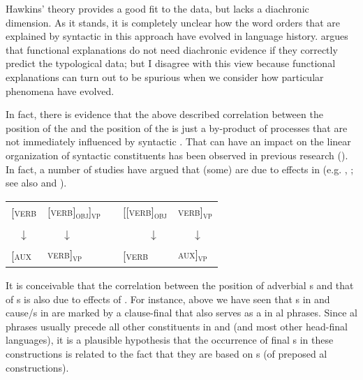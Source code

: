 \documentclass[output=paper]{langsci/langscibook}
\begin{document}
Hawkins’ theory provides a good fit to the data, but lacks a diachronic dimension. As it stands, it is completely unclear how the word orders that are explained by syntactic  in this approach have evolved in language history.  argues that functional explanations do not need diachronic evidence if they correctly predict the typological data; but I disagree with this view because functional explanations can turn out to be spurious when we consider how particular phenomena have evolved.

In fact, there is evidence that the above described correlation between the position of the  and the position of the  is just a by-product of  processes that are not immediately influenced by syntactic . That  can have an impact on the linear organization of syntactic constituents has been observed in previous research (\citealt{Li1974_Chin}). In fact, a number of studies have argued that (some)  are due to  effects in  (e.g. \citealt{Givón1975}, \citealt{Aristar1991,Bybee2010,Collins2012}; see also  and ). 

\largerpage


\ea\label{ex:diessel:18}
\begin{tabular}[t]{@{}llcll@{}}
{[\textsc{verb}} & {\textsc{[verb]\textsubscript{obj}]\textsubscript{vp}}} & \hspace{2cm} & {\textsc{[[verb]\textsubscript{obj}}} & {\textsc{verb]\textsubscript{vp}}} \\
\multicolumn{1}{c}{↓}  & ~~~↓ & & ~~~~~↓ & ~~~↓\\
{\textsc{[aux}}  & {\textsc{verb]\textsubscript{vp}}}                      &  & {\textsc{[verb}}  & {\textsc{aux]\textsubscript{vp}}}\\
\end{tabular}
\z

It is conceivable that the correlation between the position of adverbial s and that of s is also due to  effects of . For instance, above we have seen that s in  and cause/s in  are marked by a clause-final  that also serves as a   in al phrases. Since al phrases usually precede all other constituents in  and  (and most other head-final languages), it is a plausible hypothesis that the occurrence of final s in these constructions is related to the fact that they are based on s (of preposed al constructions). 
\end{document}
